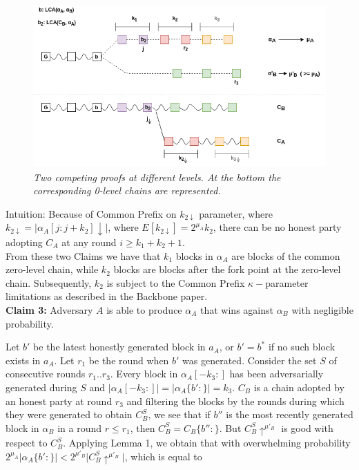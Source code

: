 \begin{figure}[h]
	\begin{center}
		\includegraphics[scale=0.5]{figures/proof.png}
	\end{center}
	\caption{\textit{Two competing proofs at different levels. At the bottom the
	corresponding 0-level chains are represented.}}
	\label{fig:proof}
\end{figure}

Intuition: Because of Common Prefix on $k_{2\downarrow}$ parameter, where
$k_{2\downarrow} = \vert \alpha_A[j:j+k_2]\downarrow\vert$, where
$E[k_{2\downarrow}] = 2^{\mu_A}k_2$, there can be no honest party adopting
$C_A$ at any round $i \geq k_1 + k_2 + 1$. \\

From these two Claims we have that $k_1$ blocks in $\alpha_A$ are blocks of the
common zero-level chain, while $k_2$ blocks are blocks after the fork point at
the zero-level chain. Subsequently, $k_2$ is subject to the Common Prefix
$\kappa-$parameter limitations as described in the Backbone paper\cite{Backbone}.\\

\textbf{Claim 3:} Adversary $A$ is able to produce $\alpha_A$ that wins against
$\alpha_B$ with negligible probability.

Let $b'$ be the latest honestly generated block in $a_A$, or $b' = b^*$ if no
such block exists in $a_A$. Let $r_1$ be the round when $b'$ was generated.
Consider the set $S$ of consecutive rounds $r_1..r_3$. Every block in
$\alpha_A[-k_3:]$ has been adversarially generated during $S$ and $\vert
\alpha_A[-k_3:] \vert = \vert \alpha_A\{b':\} \vert = k_3$. $C_B$ is a chain
adopted by an honest party at round $r_3$ and filtering the blocks by the rounds
during which they were generated to obtain $C_B^S$, we see that if $b''$ is the
most recently generated block in $\alpha_B$ in a round $r \leq r_1$, then $C_B^S =
C_B\{ b'': \}$. But $C_B^S \uparrow^{\mu'_B}$ is good with respect to $C_B^S$.
Applying Lemma 1, we obtain that with overwhelming probability  $2^{\mu_A} \vert
\alpha_A\{b':\} \vert < 2^{\mu'_B} \vert C_B^S \uparrow^{\mu'_B} \vert$, which is
equal to

